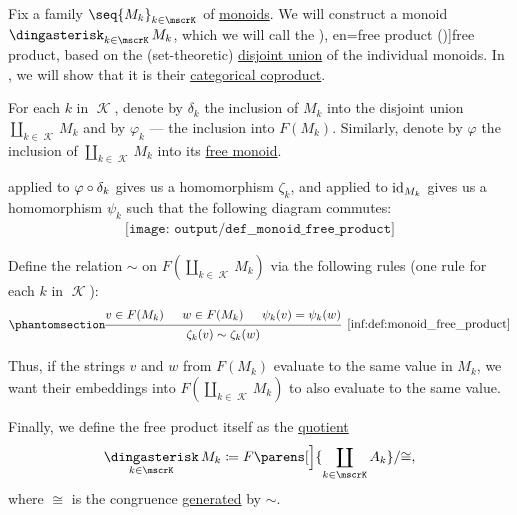 \begin{definition}\label{def:monoid_free_product}\mimprovised
  Fix a family \( \seq{ M_k }_{k \in \mscrK} \) of \hyperref[def:monoid]{monoids}. We will construct a monoid \( \Ast_{k \in \mscrK} M_k \), which we will call the \term[ru=свободное произведение (\cite[def. X.5.2]{Ляпин1960Полугруппы}), en=free product (\cite[323]{Knapp2016BasicAlgebra})]{free product}, based on the (set-theoretic) \hyperref[def:disjoint_union]{disjoint union} of the individual monoids. In , we will show that it is their \hyperref[def:discrete_category_limits]{categorical coproduct}.

  For each \( k \) in \( \mscrK \), denote by \( \delta_k \) the inclusion of \( M_k \) into the disjoint union \( \coprod_{k \in \mscrK} M_k \) and by \( \varphi_k \) --- the inclusion into \( F(M_k) \). Similarly, denote by \( \varphi \) the inclusion of \( \coprod_{k \in \mscrK} M_k \) into its \hyperref[def:free_monoid]{free monoid}.

   applied to \( \varphi \bincirc \delta_k \) gives us a homomorphism \( \zeta_k \), and applied to \( \operatorname{id}_{M_k} \) gives us a homomorphism \( \psi_k \) such that the following diagram commutes:
  \begin{equation*}
    \begin{aligned}
      \texttt{[image: output/def\_\_monoid\_free\_product]}
    \end{aligned}
  \end{equation*}

  Define the relation \( {\sim} \) on \( F(\coprod_{k \in \mscrK} M_k) \) via the following rules (one rule for each \( k \) in \( \mscrK \)):
  \begin{equation*}\taglabel[\ensuremath{ \logic{FreeProd}_k }]{inf:def:monoid_free_product}
    \begin{prooftree}
      \hypo{ v \in F(M_k) }
      \hypo{ w \in F(M_k) }
      \hypo{ \psi_k(v) = \psi_k(w) }
      \infer3[\ref{inf:def:monoid_free_product}]{ \zeta_k(v) \sim \zeta_k(w) }.
    \end{prooftree}
  \end{equation*}

  Thus, if the strings \( v \) and \( w \) from \( F(M_k) \) evaluate to the same value in \( M_k \), we want their embeddings into \( F(\coprod_{k \in \mscrK} M_k) \) to also evaluate to the same value.

  Finally, we define the free product itself as the \hyperref[def:first_order_quotient]{quotient}
  \begin{equation}\label{eq:def:monoid_free_product/product}
    \Ast_{k \in \mscrK} M_k \coloneqq F\parens[\Big]{ \coprod_{k \in \mscrK} A_k } / {\cong},
  \end{equation}
  where \( {\cong} \) is the congruence \hyperref[def:first_order_generated_congruence]{generated} by \( {\sim} \).


\end{definition}
